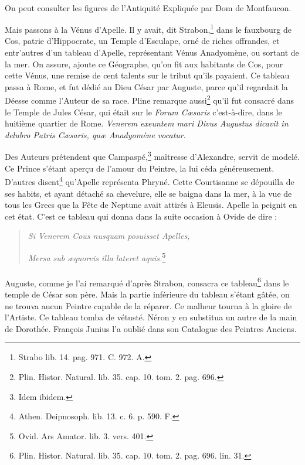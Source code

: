 \documentclass[a4paper, 18pt, oneside]{article}
\begin{document}
\paragraph{}
On peut consulter les figures de l'Antiquité Expliquée par Dom de Montfaucon.

Mais passons à la Vénus d'Apelle. Il y avait, dit Strabon,\footnote{Strabo lib. 14. pag. 971. C. 972. A.} dans le fauxbourg de Cos, patrie d'Hippocrate, un Temple d'Esculape, orné de riches offrandes, et entr'autres d'un tableau d'Apelle, représentant Vénus Anadyomène, ou sortant de la mer. On assure, ajoute ce Géographe, qu'on fit aux habitants de Cos, pour cette Vénus, une remise de cent talents sur le tribut qu'ils payaient. Ce tableau passa à Rome, et fut dédié au Dieu César par Auguste, parce qu'il regardait la Déesse comme l'Auteur de sa race. Pline remarque aussi\footnote{Plin. Histor. Natural. lib. 35. cap. 10. tom. 2. pag. 696.} qu'il fut consacré dans le Temple de Jules César, qui était sur le \emph{Forum Cæsaris} c'est-à-dire, dans le huitième quartier de Rome. \emph{Venerem exeuntem mari Divus Augustus dicavit in delubro Patris Cæsaris, quæ Anadyomène vocatur}.

Des Auteurs prétendent que Campaspé,\footnote{Idem ibidem.} maîtresse d'Alexandre, servit de modelé. Ce Prince s'étant aperçu de l'amour du Peintre, la lui céda généreusement. D'autres disent\footnote{Athen. Deipnosoph. lib. 13. c. 6. p. 590. F.} qu'Apelle représenta Phryné. Cette Courtisanne se dépouilla de ses habits, et ayant détaché sa chevelure, elle se baigna dans la mer, à la vue de tous les Grecs que la Fête de Neptune avait attirés à Eleusis. Apelle la peignit en cet état. C'est ce tableau qui donna dans la suite occasion à Ovide de dire :
\begin{quotation}
\emph{Si Venerem Cous nusquam posuisset Apelles,}

\hspace*{5mm}\emph{Mersa sub æquoreis illa lateret aquis.}\footnote{Ovid. Ars Amator. lib. 3. vers. 401.}
\end{quotation}
\paragraph{}
Auguste, comme je l'ai remarqué d'après Strabon, consacra ce tableau\footnote{Plin. Histor. Natural. lib. 35. cap. 10. tom. 2. pag. 696. lin. 31.} dans le temple de César son père. Mais la partie inférieure du tableau s'étant gâtée, on ne trouva aucun Peintre capable de la réparer. Ce malheur tourna à la gloire de l'Artiste. Ce tableau tomba de vétusté. Néron y en substitua un autre de la main de Dorothée. François Junius l'a oublié dans son Catalogue des Peintres Anciens.
\end{document}
